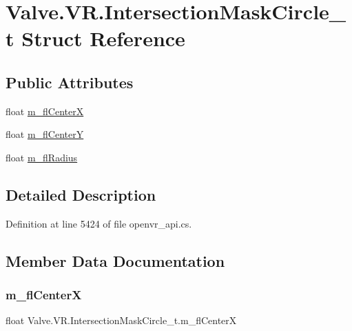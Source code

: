 \hypertarget{struct_valve_1_1_v_r_1_1_intersection_mask_circle__t}{}\section{Valve.\+V\+R.\+Intersection\+Mask\+Circle\+\_\+t Struct Reference}
\label{struct_valve_1_1_v_r_1_1_intersection_mask_circle__t}
\subsection*{Public Attributes}
\begin{DoxyCompactItemize}
\item 
float \mbox{\hyperlink{struct_valve_1_1_v_r_1_1_intersection_mask_circle__t_ae5f53a361a203b4f0baec2d918e664a1}{m\+\_\+fl\+CenterX}}
\item 
float \mbox{\hyperlink{struct_valve_1_1_v_r_1_1_intersection_mask_circle__t_a457440e8e3ec52898233884bb9aaee23}{m\+\_\+fl\+CenterY}}
\item 
float \mbox{\hyperlink{struct_valve_1_1_v_r_1_1_intersection_mask_circle__t_a2e24ed7129c3e2a7ef7015ebb15b6631}{m\+\_\+fl\+Radius}}
\end{DoxyCompactItemize}


\subsection{Detailed Description}


Definition at line 5424 of file openvr\+\_\+api.\+cs.



\subsection{Member Data Documentation}
\mbox{\label{struct_valve_1_1_v_r_1_1_intersection_mask_circle__t_ae5f53a361a203b4f0baec2d918e664a1}} 
\subsubsection{\texorpdfstring{m\_flCenterX}{m\_flCenterX}}
{\footnotesize\ttfamily float Valve.\+V\+R.\+Intersection\+Mask\+Circle\+\_\+t.\+m\+\_\+fl\+CenterX}



